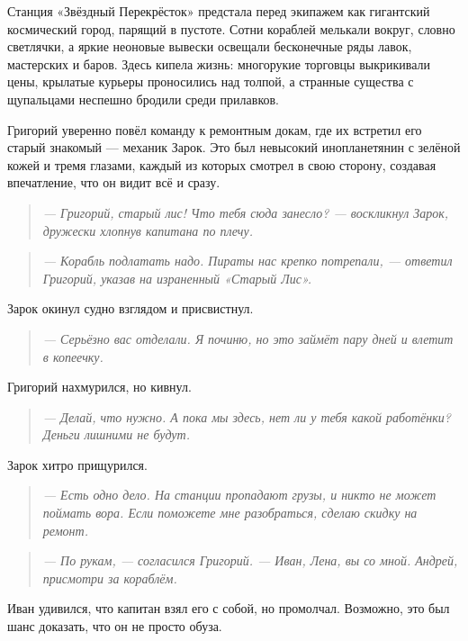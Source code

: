 \documentclass[12pt,a4paper]{book} %
\newenvironment{dialogue}{\begin{quote}\itshape}{\end{quote}}
\begin{document}
Станция «Звёздный Перекрёсток» предстала перед экипажем как гигантский космический город, парящий в пустоте. Сотни кораблей мелькали вокруг, словно светлячки, а яркие неоновые вывески освещали бесконечные ряды лавок, мастерских и баров. Здесь кипела жизнь: многорукие торговцы выкрикивали цены, крылатые курьеры проносились над толпой, а странные существа с щупальцами неспешно бродили среди прилавков.

Григорий уверенно повёл команду к ремонтным докам, где их встретил его старый знакомый --- механик Зарок. Это был невысокий инопланетянин с зелёной кожей и тремя глазами, каждый из которых смотрел в свою сторону, создавая впечатление, что он видит всё и сразу.

\begin{dialogue}
--- Григорий, старый лис! Что тебя сюда занесло? --- воскликнул Зарок, дружески хлопнув капитана по плечу.
\end{dialogue}

\begin{dialogue}
--- Корабль подлатать надо. Пираты нас крепко потрепали, --- ответил Григорий, указав на израненный «Старый Лис».
\end{dialogue}

Зарок окинул судно взглядом и присвистнул.

\begin{dialogue}
--- Серьёзно вас отделали. Я починю, но это займёт пару дней и влетит в копеечку.
\end{dialogue}

Григорий нахмурился, но кивнул.

\begin{dialogue}
--- Делай, что нужно. А пока мы здесь, нет ли у тебя какой работёнки? Деньги лишними не будут.
\end{dialogue}

Зарок хитро прищурился.

\begin{dialogue}
--- Есть одно дело. На станции пропадают грузы, и никто не может поймать вора. Если поможете мне разобраться, сделаю скидку на ремонт.
\end{dialogue}

\begin{dialogue}
--- По рукам, --- согласился Григорий. --- Иван, Лена, вы со мной. Андрей, присмотри за кораблём.
\end{dialogue}

Иван удивился, что капитан взял его с собой, но промолчал. Возможно, это был шанс доказать, что он не просто обуза.
\end{document}
